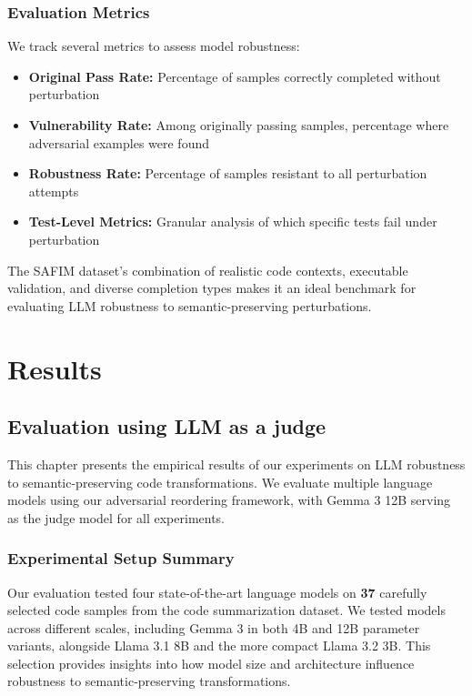 \documentclass[%
thesis=student,%
coverpage=false,%
titlepage=false,%
headmarks=true, %
english,%
font=libertine, %
math=newpxtx, %
BCOR=5mm,%
coverBCOR=11mm%
]{tum-templates/book/tumbook}
\begin{document}
\subsection{Evaluation Metrics}

We track several metrics to assess model robustness:

\begin{itemize}
    \item \textbf{Original Pass Rate:} Percentage of samples correctly completed without perturbation
    \item \textbf{Vulnerability Rate:} Among originally passing samples, percentage where adversarial examples were found
    \item \textbf{Robustness Rate:} Percentage of samples resistant to all perturbation attempts
    \item \textbf{Test-Level Metrics:} Granular analysis of which specific tests fail under perturbation
\end{itemize}

The SAFIM dataset's combination of realistic code contexts, executable validation, and diverse completion types makes it an ideal benchmark for evaluating LLM robustness to semantic-preserving perturbations.


\chapter{Results}
\label{ch:Results}

\section{Evaluation using LLM as a judge}

This chapter presents the empirical results of our experiments on LLM robustness to semantic-preserving code transformations. We evaluate multiple language models using our adversarial reordering framework, with Gemma 3 12B serving as the judge model for all experiments.

\subsection{Experimental Setup Summary}

Our evaluation tested four state-of-the-art language models on \textbf{37} carefully selected code samples from the code summarization dataset. We tested models across different scales, including Gemma 3 in both 4B and 12B parameter variants, alongside Llama 3.1 8B and the more compact Llama 3.2 3B. This selection provides insights into how model size and architecture influence robustness to semantic-preserving transformations.
\end{document}
